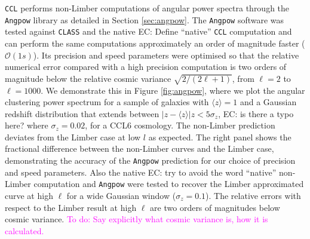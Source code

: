 \documentclass[\docopts]{\docclass}
\newcommand{\todo}[1]{\textcolor{magenta}{To do: #1}}
\newcommand{\elisa}[1]{\textcolor{green!10!orange!90!}{EC: #1}}
\newcommand{\ccl}{{\tt CCL}\xspace}
\begin{document}
\ccl performs non-Limber computations of angular power spectra through the {\tt Angpow} library as detailed in Section \ref{sec:angpow}. The \texttt{Angpow} software was tested against \texttt{CLASS} and the native \elisa{Define ``native''} \ccl computation and can perform the same computations approximately an order of magnitude faster ($\mathcal{O}(1s)$). 
Its precision and speed parameters were optimised so that the relative numerical error compared with a high precision computation is two orders of magnitude below the relative cosmic variance $\sqrt{2/(2\ell+1)}$, from $\ell=2$ to $\ell=1000$. We demonstrate this in Figure \ref{fig:angpow}, where we plot the angular clustering power spectrum for a sample of galaxies with $\langle z \rangle=1$ and a Gaussian redshift distribution that extends between $|z-\langle z \rangle|z<5\sigma_z$, \elisa{is there a typo here?} where $\sigma_z=0.02$, for a CCL6 cosmology. 
The non-Limber prediction deviates from the Limber case at low $l$ as expected. The right panel shows the fractional difference between the non-Limber curves and the Limber case, demonstrating the accuracy of the {\tt Angpow} prediction for our choice of precision and speed parameters. 
Also the native \elisa{try to avoid the word ``native''} non-Limber computation and {\tt Angpow} were tested to recover the Limber approximated curve at high $\ell$ for a wide Gaussian window ($\sigma_z=0.1$). The relative errors with respect to the Limber result at high $\ell$ are two orders of magnitudes below cosmic variance. \todo{Say explicitly what cosmic variance is, how it is calculated.}
\end{document}
